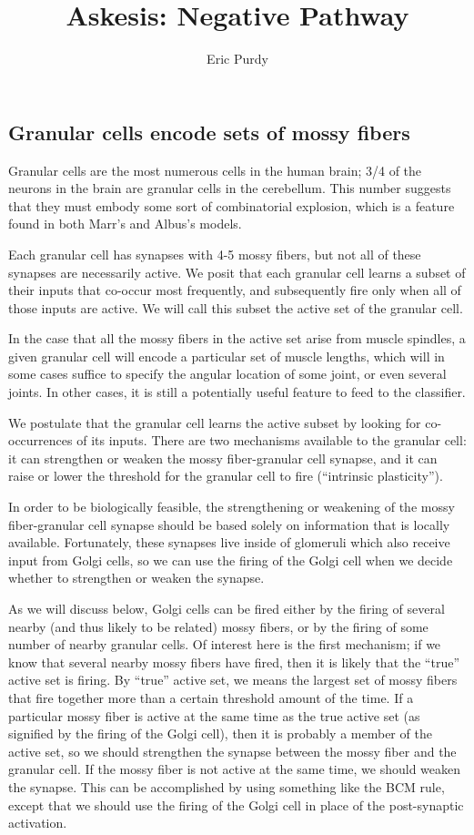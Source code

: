 \documentclass{article}
\title{Askesis: Negative Pathway} \author{Eric Purdy}
\theoremstyle{definition}
\begin{document}
\maketitle


\subsection{Granular cells encode sets of mossy fibers}

Granular cells are the most numerous cells in the human brain; 3/4 of
the neurons in the brain are granular cells in the cerebellum. This
number suggests that they must embody some sort of combinatorial
explosion, which is a feature found in both Marr's and Albus's models. 

Each granular cell has synapses with 4-5 mossy fibers, but not all of
these synapses are necessarily active. We posit that each granular
cell learns a subset of their inputs that co-occur most frequently,
and subsequently fire only when all of those inputs are active. We
will call this subset the active set of the granular cell.

In the case that all the mossy fibers in the active set arise from
muscle spindles, a given granular cell will encode a particular set of
muscle lengths, which will in some cases suffice to specify the
angular location of some joint, or even several joints. In other
cases, it is still a potentially useful feature to feed to the
classifier.

We postulate that the granular cell learns the active subset by
looking for co-occurrences of its inputs. There are two mechanisms
available to the granular cell: it can strengthen or weaken the mossy
fiber-granular cell synapse, and it can raise or lower the threshold
for the granular cell to fire (``intrinsic plasticity''). 

In order to be biologically feasible, the strengthening or weakening
of the mossy fiber-granular cell synapse should be based solely on
information that is locally available. Fortunately, these synapses
live inside of glomeruli which also receive input from Golgi cells, so
we can use the firing of the Golgi cell when we decide whether to
strengthen or weaken the synapse.

As we will discuss below, Golgi cells can be fired either by the
firing of several nearby (and thus likely to be related) mossy fibers,
or by the firing of some number of nearby granular cells. Of interest
here is the first mechanism; if we know that several nearby mossy
fibers have fired, then it is likely that the ``true'' active set is
firing.  By ``true'' active set, we means the largest set of mossy
fibers that fire together more than a certain threshold amount of the
time. If a particular mossy fiber is active at the same time as the
true active set (as signified by the firing of the Golgi cell), then
it is probably a member of the active set, so we should strengthen the
synapse between the mossy fiber and the granular cell. If the mossy
fiber is not active at the same time, we should weaken the synapse.
This can be accomplished by using something like the BCM rule, except
that we should use the firing of the Golgi cell in place of the
post-synaptic activation.
\end{document}
